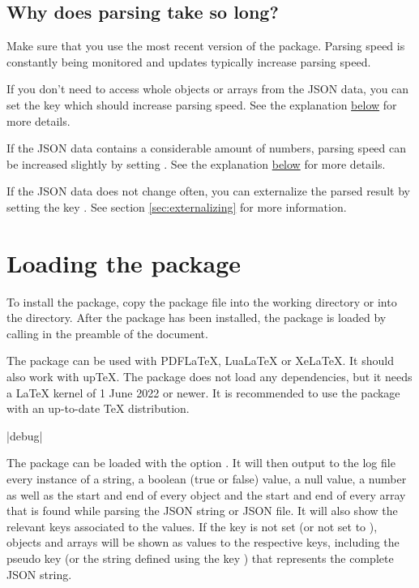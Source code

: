 \documentclass[a4paper]{article}
\begin{document}
\subsection{Why does parsing take so long?}

Make sure that you use the most recent version of the package. Parsing speed is constantly being monitored and updates typically increase parsing speed.

If you don't need to access whole objects or arrays from the JSON data, you can set the key  which should increase parsing speed. See the explanation \hyperlink{key:skipstructures}{below} for more details.

If the JSON data contains a considerable amount of numbers, parsing speed can be increased slightly by setting . See the explanation \hyperlink{key:validatenumbers}{below} for more details.

If the JSON data does not change often, you can externalize the parsed result by setting the key . See section \ref{sec:externalizing} for more information.

\section{Loading the package}

To install the package, copy the package file  into the working directory or into the  directory. After the package has been installed, the  package is loaded by calling \macro{\usepackage{jsonparse}} in the preamble of the document.

The package can be used with PDFLaTeX, LuaLaTeX or XeLaTeX. It should also work with upTeX. The package does not load any dependencies, but it needs a LaTeX kernel of 1 June 2022 or newer. It is recommended to use the package with an up-to-date TeX distribution.

\begin{macrodef}
|debug|
\end{macrodef}
The package can be loaded with the option . It will then output to the log file every instance of a string, a boolean (true or false) value, a null value, a number as well as the start and end of every object and the start and end of every array that is found while parsing the JSON string or JSON file. It will also show the relevant keys associated to the values. If the key  is not set (or not set to ), objects and arrays will be shown as values to the respective keys, including the pseudo key  (or the string defined using the key ) that represents the complete JSON string.
\end{document}
